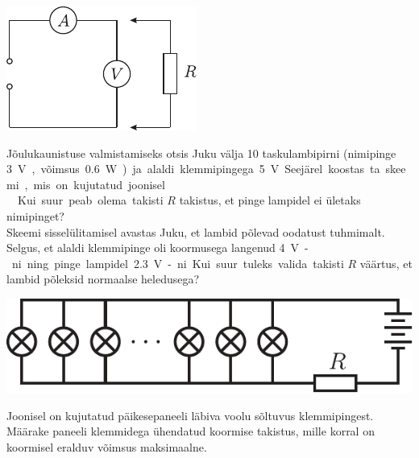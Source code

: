 \documentclass[10pt, twoside]{article}
\begin{document}
{\begin{center}
	\includegraphics[width=0.5\linewidth]{2006-v3g-01-yl}
\end{center}
\probend
\bigskip


Jõulukaunistuse valmistamiseks otsis Juku välja 10
taskulambipirni (nimipinge \SI{3}V, võimsus \SI{0.6}W) ja alaldi klemmipingega \SI{5}V.
Seejärel koostas ta skeemi, mis on kujutatud joonisel.\\
\osa Kui suur peab olema
takisti $R$ takistus, et pinge lampidel ei ületaks nimipinget?\\
\osa Skeemi sisselülitamisel avastas Juku, et lambid põlevad oodatust tuhmimalt. Selgus, et alaldi
klemmipinge oli koormusega langenud \SI{4}V-ni ning pinge lampidel \SI{2,3}V-ni. Kui suur
tuleks valida takisti $R$ väärtus, et lambid põleksid normaalse heledusega?

\begin{center}
	\includegraphics[width=0.8\linewidth]{2009-v2g-04-yl}
\end{center}
\probend
\bigskip


Joonisel on kujutatud päikesepaneeli läbiva voolu sõltuvus klemmipingest.
Määrake paneeli klemmidega ühendatud koormise takistus, mille korral on koormisel eralduv
võimsus maksimaalne.

}
\end{document}

